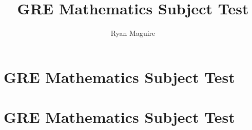 \documentclass[crop=false,class=book,oneside]{standalone}
\begin{document}
    \ifx\ifwork\undefined
        \title{GRE Mathematics Subject Test}
        \author{Ryan Maguire}
        \date{\vspace{-5ex}}
        \maketitle
        \tableofcontents
        \clearpage
        \chapter*{GRE Mathematics Subject Test}
        \setcounter{chapter}{1}
    \else
        \chapter{GRE Mathematics Subject Test}
    \fi
\end{document}
